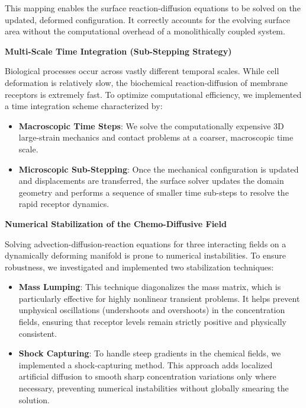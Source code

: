 \documentclass[a4paper,12pt]{article}
\begin{document}
  This mapping enables the surface reaction-diffusion equations to be solved on the updated, deformed configuration. It correctly accounts for the evolving surface area without the computational overhead of a monolithically coupled system.

\noindent\textbf{Multi-Scale Time Integration (Sub-Stepping Strategy)}

\noindent Biological processes occur across vastly different temporal scales. While cell deformation is relatively slow, the biochemical reaction-diffusion of membrane receptors is extremely fast. To optimize computational efficiency, we implemented a time integration scheme characterized by:

\begin{itemize}[left=1.5em, itemsep=0pt, topsep=0pt]
    \item \textbf{Macroscopic Time Steps}:  We solve the computationally expensive 3D large-strain mechanics and contact problems at a coarser, macroscopic time scale.
    \item \textbf{Microscopic Sub-Stepping}:  Once the mechanical configuration is updated and displacements are transferred, the surface solver updates the domain geometry and performs a sequence of smaller time sub-steps to resolve the rapid receptor dynamics.
\end{itemize}



\noindent\textbf{Numerical Stabilization of the Chemo-Diffusive Field}

\noindent Solving advection-diffusion-reaction equations for three interacting fields on a dynamically deforming manifold is prone to numerical instabilities. To ensure robustness, we investigated and implemented two stabilization techniques:
\begin{itemize}[left=1.5em, itemsep=0pt, topsep=0pt]
    \item \textbf{Mass Lumping}: This technique diagonalizes the mass matrix, which is particularly effective for highly nonlinear transient problems. It helps prevent unphysical oscillations (undershoots and overshoots) in the concentration fields, ensuring that receptor levels remain strictly positive and physically consistent.
\item \textbf{Shock Capturing}:  To handle steep gradients in the chemical fields, we implemented a shock-capturing method. This approach adds localized artificial diffusion to smooth sharp concentration variations only where necessary, preventing numerical instabilities without globally smearing the solution.
\end{itemize}
\end{document}
